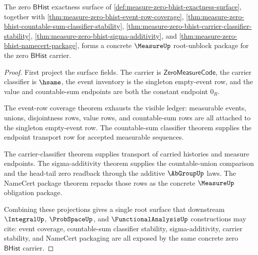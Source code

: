 \begin{theorem}
\label{thm:measure-zero-bhist-concrete-exactness-package}
The zero $\mathsf{BHist}$ exactness surface of
\autoref{def:measure-zero-bhist-exactness-surface}, together with
\autoref{thm:measure-zero-bhist-event-row-coverage},
\autoref{thm:measure-zero-bhist-countable-sum-classifier-stability},
\autoref{thm:measure-zero-bhist-carrier-classifier-stability},
\autoref{thm:measure-zero-bhist-sigma-additivity}, and
\autoref{thm:measure-zero-bhist-namecert-package}, forms a concrete
$\MeasureUp$ root-unblock package for the zero $\mathsf{BHist}$ carrier.
\end{theorem}
\begin{proof}
First project the surface fields. The carrier is
$\mathsf{ZeroMeasureCode}$, the carrier classifier is $\hsame$, the event
inventory is the singleton empty-event row, and the value and countable-sum
endpoints are both the constant endpoint $0_R$.

The event-row coverage theorem exhausts the visible ledger: measurable events,
unions, disjointness rows, value rows, and countable-sum rows are all attached
to the singleton empty-event row. The countable-sum classifier theorem supplies
the endpoint transport row for accepted measurable sequences.

The carrier-classifier theorem supplies transport of carried histories and
measure endpoints. The sigma-additivity theorem supplies the countable-union
comparison and the head-tail zero readback through the additive $\AbGroupUp$
laws. The NameCert package theorem repacks those rows as the concrete
$\MeasureUp$ obligation package.

Combining these projections gives a single root surface that downstream
$\IntegralUp$, $\ProbSpaceUp$, and $\FunctionalAnalysisUp$ constructions may
cite: event coverage, countable-sum classifier stability, sigma-additivity,
carrier stability, and NameCert packaging are all exposed by the same concrete
zero $\mathsf{BHist}$ carrier.
\end{proof}
